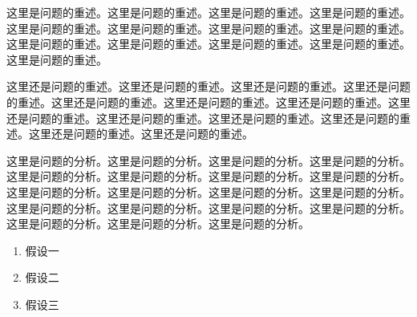 \setcounter{page}{1}

%
%



这里是问题的重述。这里是问题的重述。这里是问题的重述。这里是问题的重述。这里是问题的重述。这里是问题的重述。这里是问题的重述。这里是问题的重述。这里是问题的重述。这里是问题的重述。这里是问题的重述。这里是问题的重述。这里是问题的重述。


这里还是问题的重述。这里还是问题的重述。这里还是问题的重述。这里还是问题的重述。这里还是问题的重述。这里还是问题的重述。这里还是问题的重述。这里还是问题的重述。这里还是问题的重述。这里还是问题的重述。这里还是问题的重述。这里还是问题的重述。这里还是问题的重述。





这里是问题的分析。这里是问题的分析。这里是问题的分析。这里是问题的分析。这里是问题的分析。这里是问题的分析。这里是问题的分析。这里是问题的分析。这里是问题的分析。这里是问题的分析。这里是问题的分析。这里是问题的分析。这里是问题的分析。这里是问题的分析。这里是问题的分析。这里是问题的分析。这里是问题的分析。这里是问题的分析。这里是问题的分析。




\begin{enumerate}
    \item 假设一
    \item 假设二
    \item 假设三
\end{enumerate}



